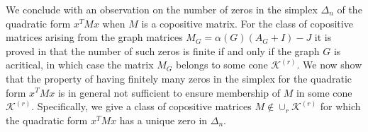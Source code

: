 \documentclass[11pt]{article}
\newcommand{\ignore}[1]{}
\newtheorem{example}[theorem]{Example}
\numberwithin{equation}{section}
\newcommand{\COP}{{\text{\rm COP}}}
\newcommand{\MK}{{\mathcal K}}
\begin{document}
 We conclude with an observation on the number of zeros in the simplex $\Delta_n$ of the quadratic form $x^TMx$ when $M$ is a copositive matrix.
For the class of copositive matrices arising from the graph matrices  $M_G =\alpha(G)(A_{G}+I)-J$ it is proved in   \cite{LV2021} that the number of such zeros is finite if and only if the graph $G$ is acritical, in which case the matrix $M_G$ belongs to some cone $\MK^{(r)}$. 
We now show that the property of having finitely many zeros  in the simplex for the quadratic form $x^TMx$  is in general not sufficient to ensure membership of $M$ in some cone $\MK^{(r)}$.  %
 Specifically, we give a class  of copositive matrices $M\not\in \cup_{r} \MK^{(r)}$ for which the quadratic form $x^TMx$ has a unique zero in $\Delta_n$.

\ignore{
\begin{example}
Let $M$ be an $n\times n$ strictly copositive matrix such that $M\notin \MK_n^{(0)}$. Consider the matrix $M_{G_9} = 4(A_{G_9}+I)-J$, where $G_9$ is the acritical graph shown in Figure \ref{graph_G_9}. Then we have 
\begin{equation}
A:=\left(
\begin{array}{c|c}
M & 0\\
\hline
0 & M_{G_9}
\end{array}
\right) \in \COP\setminus \bigcup_{r\ge 0}\MK_{n+9}^{(r)}.
\end{equation}
Now we prove that the quadratic form $x^TAx$ has finitely many zeros over the simplex. Let $x\in \Delta_{n+9}$ such that $x^TAx=0$. Since $M$ is strictly copositive then $x_i=0$ for $i=1, \dots , n$ and $(x_{n+1}, x_{n+2}, \dots, x_{n+9})$ correspond to  a zero of the quadratic form $x^TM_{G_9}x$ over the simplex. Since $G_9$ is acritical then the quadratic form $x^TM_{G_9}x$ has finitely many zeros over the simplex (corresponding to the $\alpha$-stable sets of $G_9$, see Theorem \ref{minimizers-LV}). This completes the proof.
\end{example}
}
\end{document}
